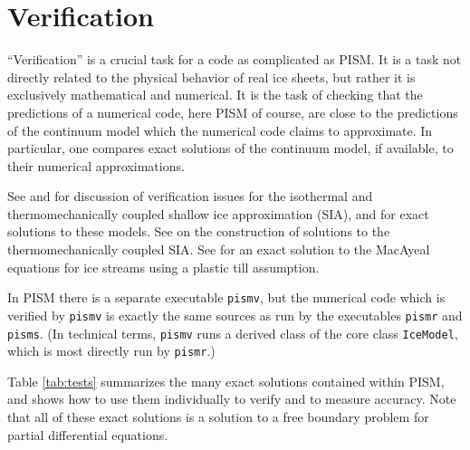 \documentclass[11pt,final]{amsart}
\begin{document}
\section{Verification}  ``Verification'' is a crucial task for a code as complicated as PISM.  It is a task not directly related to the physical behavior of real ice sheets, but rather it is exclusively mathematical and numerical.  It is the task of checking that the predictions of a numerical code, here PISM of course, are close to the predictions of the continuum model which the numerical code claims to approximate.  In particular, one compares exact solutions of the continuum model, if available, to their numerical approximations.

See \cite{BLKCB} and \cite{BBL} for discussion of verification issues for the isothermal and thermomechanically coupled shallow ice approximation (SIA), and for exact solutions to these models.  See \cite{BB} on the construction of solutions to the thermomechanically coupled SIA.  See \cite{SchoofStream} for an exact solution to the MacAyeal equations for ice streams using a plastic till assumption.

In PISM there is a separate executable \verb|pismv|, but the numerical code which is verified by \verb|pismv| is exactly the same sources as run by the executables \verb|pismr| and \verb|pisms|.  (In technical terms, \verb|pismv| runs a derived class of the core class \verb|IceModel|, which is most directly run by \verb|pismr|.)

Table \ref{tab:tests} summarizes the many exact solutions contained within PISM, and shows how to use them individually to verify and to measure accuracy.   Note that all of these exact solutions is a solution to a free boundary problem for partial differential equations.
\end{document}

